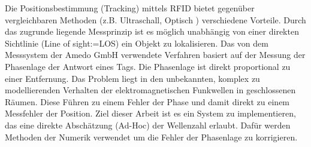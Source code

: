 Die Positionsbestimmung (Tracking) mittels RFID bietet gegenüber vergleichbaren
Methoden (z.B. Ultraschall, Optisch ) verschiedene Vorteile. Durch das
zugrunde liegende Messprinzip ist es möglich unabhängig von einer direkten
Sichtlinie (Line of sight:=LOS) ein Objekt zu lokalisieren. Das von dem
Messsystem der Amedo GmbH verwendete Verfahren basiert auf der Messung der
Phasenlage der Antwort eines Tags. Die Phasenlage ist direkt proportional zu
einer Entfernung. Das Problem liegt in den unbekannten, komplex zu
modellierenden Verhalten der elektromagnetischen Funkwellen in geschlossenen
Räumen. Diese Führen zu einem Fehler der Phase und damit direkt zu einem
Messfehler der Position.
\newline
Ziel dieser Arbeit ist es ein System zu
implementieren, das eine direkte Abschätzung (Ad-Hoc) der Wellenzahl erlaubt.
Dafür werden Methoden der Numerik verwendet um die Fehler der Phasenlage zu
korrigieren.